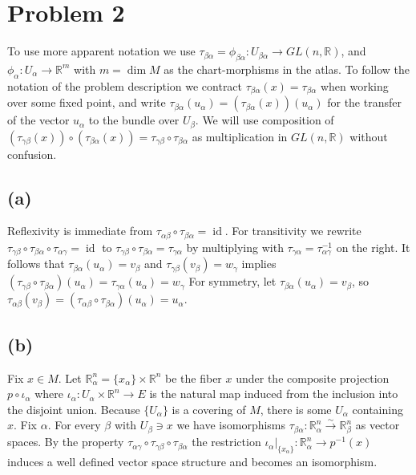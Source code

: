 \documentclass[english]{article}
\DeclareMathOperator{\id}{id}
\newcommand{\restrict}[1]{\left.{#1}\right|}
\begin{document}
\section*{Problem 2}

To use more apparent notation we use $\tau_{\beta\alpha}=\phi_{\beta\alpha}\colon U_{\beta\alpha}\to GL(n,\mathbb R)$,
and $\phi_\alpha\colon U_\alpha\to \mathbb R^m$ with $m=\dim M$ as the chart-morphisms in the atlas.
To follow the notation of the problem description we contract $\tau_{\beta\alpha}(x)=\tau_{\beta\alpha}$
when working over some fixed point, and write $\tau_{\beta\alpha}(u_\alpha) = (\tau_{\beta\alpha}(x))(u_\alpha)$
for the transfer of the vector $u_\alpha$ to the bundle over $U_\beta$.
We will use composition of $(\tau_{\gamma\beta}(x))\circ(\tau_{\beta\alpha}(x))=\tau_{\gamma\beta}\circ\tau_{\beta\alpha}$
as multiplication in $GL(n,\mathbb R)$ without confusion.

\subsection*{(a)}
Reflexivity is immediate from $\tau_{\alpha\beta}\circ\tau_{\beta\alpha}=\id$.
For transitivity we rewrite $\tau_{\gamma\beta}\circ\tau_{\beta\alpha}\circ\tau_{\alpha\gamma}=\id$
to $\tau_{\gamma\beta}\circ\tau_{\beta\alpha}=\tau_{\gamma\alpha}$ 
by multiplying with $\tau_{\gamma\alpha} = \tau_{\alpha\gamma}^{-1}$ on the right.
It follows that 
$\tau_{\beta\alpha}(u_\alpha)=v_\beta$ and $\tau_{\gamma\beta}(v_\beta)=w_\gamma$
implies $(\tau_{\gamma\beta}\circ\tau_{\beta\alpha})(u_\alpha)=\tau_{\gamma\alpha}(u_\alpha)=w_\gamma$
For symmetry, let $\tau_{\beta\alpha}(u_\alpha)=v_\beta$,
so $\tau_{\alpha\beta}(v_\beta)=(\tau_{\alpha\beta}\circ\tau_{\beta\alpha})(u_\alpha)=u_\alpha$.

\subsection*{(b)}
Fix $x\in M$.
Let $\mathbb R^n_\alpha=\{x_\alpha\}\times\mathbb R^n$ be the fiber $x$ under the composite projection $p\circ \iota_\alpha$
where $\iota_\alpha\colon U_\alpha\times\mathbb R^n\to E$ is the natural map induced from the inclusion into the disjoint union.
Because $\{U_\alpha\}$ is a covering of $M$, there is some $U_\alpha$ containing $x$.
Fix $\alpha$.
For every $\beta$ with $U_\beta\ni x$ we have isomorphisms $\tau_{\beta\alpha}\colon \mathbb R^n_\alpha\xrightarrow{\sim}\mathbb R^n_\beta$
as vector spaces.
By the property $\tau_{\alpha\gamma}\circ\tau_{\gamma\beta}\circ\tau_{\beta\alpha}$ the restriction
$\restrict{\iota_\alpha}_{\{x_\alpha\}}\colon \mathbb R^n_\alpha\to p^{-1}(x)$ induces a well defined vector space structure
and becomes an isomorphism.
\end{document}
